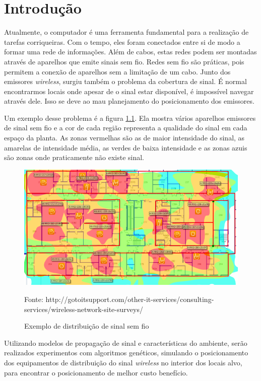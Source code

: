 \documentclass[tc,twoside]{iiufrgs}
\begin{document}
\chapter{Introdução} 

Atualmente, o computador é uma ferramenta fundamental para a realização de tarefas corriqueiras. Com o tempo, eles foram conectados entre si de modo a formar uma rede de informações. Além de cabos, estas redes podem ser montadas através de aparelhos que emite sinais sem fio. Redes sem fio são práticas, pois permitem a conexão de aparelhos sem a limitação de um cabo. Junto dos emissores \textit{wireless}, surgiu também o problema da cobertura de sinal. É normal encontrarmos locais onde apesar de o sinal estar disponível, é impossível navegar através dele. Isso se deve ao mau planejamento do posicionamento dos emissores.

Um exemplo desse problema é a figura \ref{fig:problemaCobertura}. Ela mostra vários aparelhos emissores de sinal sem fio e a cor de cada região representa a qualidade do sinal em cada espaço da planta. As zonas vermelhas são as de maior intensidade do sinal, as amarelas de intensidade média, as verdes de baixa intensidade e as zonas azuis são zonas onde praticamente não existe sinal. 

\begin{figure}[h]
\centering
\includegraphics[scale=0.5]{img/problemaCobertura.png}
\caption{Exemplo de distribuição de sinal sem fio}
Fonte: http://gotoitsupport.com/other-it-services/consulting-services/wireless-network-site-surveys/
\label{fig:problemaCobertura}
\end{figure}

Utilizando modelos de propagação de sinal e características do ambiente, serão realizados experimentos com algoritmos genéticos, simulando o posicionamento dos equipamentos de distribuição do sinal \textit{wireless} no interior dos locais alvo, para encontrar o posicionamento de melhor custo benefício.
\end{document}
